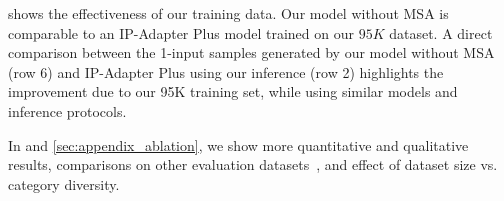 \begin{table}[!t]
\centering
\setlength{\tabcolsep}{5pt}
\vspace{-8pt}
\caption{ \textbf{Dataset curation ablation.} MSA consistently enhances intra-cluster DINOv2-I similarity. While warping does not impact DINOv2-I scores, its qualitative benefits are shown in . 
}

\label{tbl:dataset_ablation}
\vspace{-12pt}
\end{table}















 shows the effectiveness of our training data.
Our model without MSA is comparable to an IP-Adapter Plus model trained on our $95K$ dataset. A direct comparison between the 1-input samples generated by our model without MSA (row 6) and IP-Adapter Plus using our inference (row 2) highlights the improvement due to our 95K training set, while using similar models and inference protocols.

In  and \ref{sec:appendix_ablation}, we show more quantitative and qualitative results, comparisons on other evaluation datasets~\cite{kumari2023multi}, and effect of dataset size vs. category diversity.












